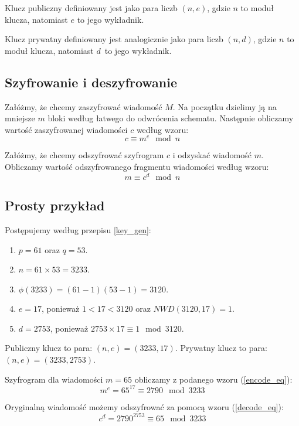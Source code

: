 \documentclass[10pt,a4paper]{article}
\begin{document}
Klucz publiczny definiowany jest jako para liczb $(n, e)$, gdzie $n$ to moduł klucza, natomiast $e$ to jego wykładnik.

Klucz prywatny definiowany jest analogicznie jako para liczb $(n, d)$, gdzie $n$ to moduł klucza, natomiast $d$~to jego wykładnik.

\subsection{Szyfrowanie i deszyfrowanie} \label{encode_decode}
Załóżmy, że chcemy zaszyfrować wiadomość $M$. Na początku dzielimy ją na mniejsze $m$ bloki według łatwego do odwrócenia schematu. Następnie obliczamy wartość zaszyfrowanej wiadomości $c$ według wzoru:
\begin{equation} \label{encode_eq}
c \equiv m^e \mod n
\end{equation} 

Załóżmy, że chcemy odszyfrować szyfrogram $c$ i odzyskać wiadomość $m$. Obliczamy wartość odszyfrowanego fragmentu wiadomości według wzoru:
\begin{equation} \label{decode_eq}
m \equiv c^d \mod n
\end{equation}

\subsection{Prosty przykład}

Postępujemy według przepisu \ref{key_gen}:

\begin{enumerate}
\item $p = 61$ oraz $q = 53$.
\item $n = 61 \times 53 = 3233 $.
\item $\phi(3233) = (61-1)(53-1) = 3120$.
\item $e=17$, ponieważ $1<17<3120$ oraz $NWD(3120, 17) = 1$.
\item $d=2753$, ponieważ $2753 \times 17 \equiv 1 \mod 3120$.
\end{enumerate}

Publiczny klucz to para: $(n, e)=(3233,17)$.
Prywatny klucz to para: $(n, e)=(3233,2753)$.

Szyfrogram dla wiadomości $m = 65$ obliczamy z podanego wzoru (\ref{encode_eq}):
\begin{equation} 
m^e = 65^{17} \equiv 2790 \mod 3233
\end{equation}

Oryginalną wiadomość możemy odszyfrować za pomocą wzoru (\ref{decode_eq}):
\begin{equation} 
c^d = 2790^{2753} \equiv 65 \mod 3233
\end{equation}
\end{document}
